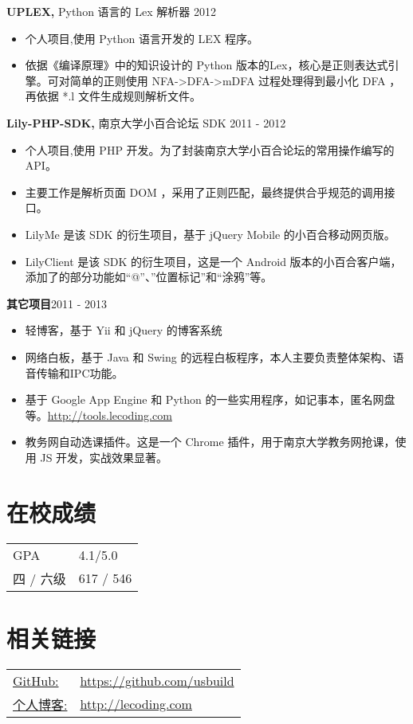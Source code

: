 ﻿\documentclass[margin]{res}
\begin{document}
\begin{resume}
{\bf UPLEX,} Python 语言的 Lex 解析器 \hfill 2012
\begin{itemize} \itemsep -2pt
\item 个人项目,使用 Python 语言开发的 LEX 程序。
\item 依据《编译原理》中的知识设计的 Python 版本的Lex，核心是正则表达式引擎。可对简单的正则使用 NFA->DFA->mDFA 过程处理得到最小化 DFA ，再依据 *.l 文件生成规则解析文件。
\end{itemize}

{\bf Lily-PHP-SDK,} 南京大学小百合论坛 SDK \hfill 2011 - 2012
\begin{itemize} \itemsep -2pt
\item 个人项目,使用 PHP 开发。为了封装南京大学小百合论坛的常用操作编写的 API。
\item 主要工作是解析页面 DOM ，采用了正则匹配，最终提供合乎规范的调用接口。
\item LilyMe 是该 SDK 的衍生项目，基于 jQuery Mobile 的小百合移动网页版。
\item LilyClient 是该 SDK 的衍生项目，这是一个 Android 版本的小百合客户端，添加了的部分功能如“@”、”位置标记”和“涂鸦”等。
\end{itemize}

{\bf 其它项目}\hfill 2011 - 2013
\begin{itemize} \itemsep -2pt
\item 轻博客，基于 Yii 和 jQuery 的博客系统
\item 网络白板，基于 Java 和 Swing 的远程白板程序，本人主要负责整体架构、语音传输和IPC功能。
\item 基于 Google App Engine 和 Python 的一些实用程序，如记事本，匿名网盘等。\href{http://tools.lecoding.com}{http://tools.lecoding.com}
\item 教务网自动选课插件。这是一个 Chrome 插件，用于南京大学教务网抢课，使用 JS 开发，实战效果显著。
\end{itemize}

\section{在校成绩} 
   \begin{tabular}{l p{3in}}
      GPA &  4.1/5.0 \\
      四 / 六级 & 617 / 546
 \end{tabular}

\section{相关链接}
   \begin{tabular}{l p{3in}}
     \underline{GitHub:} &  \href{https://github.com/usbuild}{https://github.com/usbuild}\\
     \underline{个人博客:} & \href{http://lecoding.com}{http://lecoding.com}\\
 \end{tabular}

\end{resume} 
\end{document}
